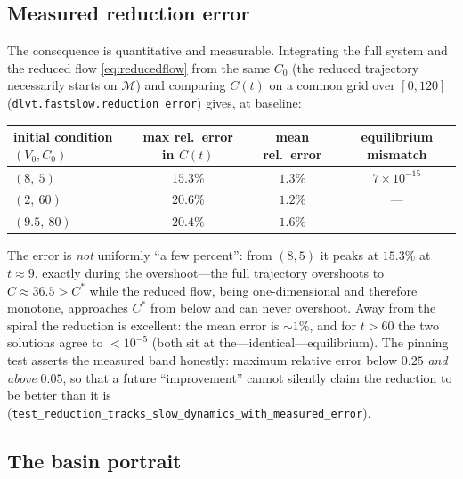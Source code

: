 \subsection{Measured reduction error}

The consequence is quantitative and measurable. Integrating the full
system and the reduced flow \eqref{eq:reducedflow} from the same
$C_{0}$ (the reduced trajectory necessarily starts on $\mathcal{M}$)
and comparing $C(t)$ on a common grid over $[0,120]$
(\texttt{dlvt.fastslow.reduction\_error}) gives, at baseline:

\begin{center}
\begin{tabular}{lccc}
initial condition $(V_0, C_0)$ & max rel.\ error in $C(t)$ &
mean rel.\ error & equilibrium mismatch\\
\hline
$(8,\ 5)$    & $15.3\%$ & $1.3\%$ & $7\times10^{-15}$\\
$(2,\ 60)$   & $20.6\%$ & $1.2\%$ & ---\\
$(9.5,\ 80)$ & $20.4\%$ & $1.6\%$ & ---\\
\end{tabular}
\end{center}

The error is \emph{not} uniformly ``a few percent'': from $(8,5)$ it
peaks at $15.3\%$ at $t\approx9$, exactly during the overshoot---the full
trajectory overshoots to $C\approx36.5>C^{*}$ while the reduced flow,
being one-dimensional and therefore monotone, approaches $C^{*}$ from
below and can never overshoot. Away from the spiral the reduction is
excellent: the mean error is $\sim1\%$, and for $t>60$ the two solutions
agree to $<10^{-5}$ (both sit at the---identical---equilibrium). The
pinning test asserts the measured band honestly: maximum relative error
below $0.25$ \emph{and above} $0.05$, so that a future ``improvement''
cannot silently claim the reduction to be better than it is
(\texttt{test\_reduction\_tracks\_slow\_dynamics\_with\_measured\_error}).

\subsection{The basin portrait}

